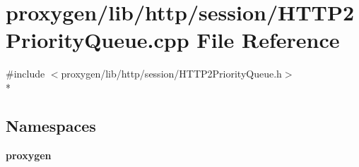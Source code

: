 \section{proxygen/lib/http/session/\+H\+T\+T\+P2\+Priority\+Queue.cpp File Reference}
\label{HTTP2PriorityQueue_8cpp}
{\ttfamily \#include $<$proxygen/lib/http/session/\+H\+T\+T\+P2\+Priority\+Queue.\+h$>$}\\*
\subsection*{Namespaces}
\begin{DoxyCompactItemize}
\item 
 {\bf proxygen}
\end{DoxyCompactItemize}
